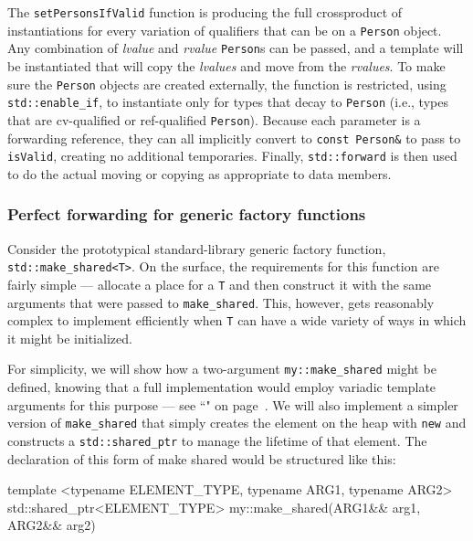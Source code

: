 \noindent The \texttt{setPersonsIfValid} function is producing the full crossproduct of instantiations for every variation of qualifiers that can be
on a \texttt{Person} object. Any combination of \emph{lvalue} and
\emph{rvalue} \texttt{Person}s can be passed, and a template will be
instantiated that will copy the \emph{lvalues} and move from the
\emph{rvalues}. To make sure the \texttt{Person} objects are
created externally, the function is restricted, using
\texttt{std::enable\_if}, to instantiate only for types that decay to
\texttt{Person} (i.e., types that are cv-qualified or ref-qualified
\texttt{Person}). Because each parameter is a forwarding reference, they
can all implicitly convert to \texttt{const}~\texttt{Person\&} to pass
to \texttt{isValid}, creating no additional temporaries. Finally,
\texttt{std::forward} is then used to do the actual moving or copying as
appropriate to data members.

\subsubsection[Perfect forwarding for generic factory functions]{Perfect forwarding for generic factory functions}\label{perfect-forwarding-for-generic-factory-functions}

Consider the prototypical standard-library generic factory function,
\texttt{std::make\_shared<T>}. On the surface, the requirements for this
function are fairly simple --- allocate a place for a \texttt{T} and
then construct it with the same arguments that were passed to
\texttt{make\_shared}. This, however, gets reasonably complex to
implement efficiently when \texttt{T} can have a wide variety of ways in
which it might be initialized.

For simplicity, we will show how a two-argument \texttt{my::make\_shared}
might be defined, knowing that a full implementation would employ
variadic template arguments for this purpose --- see ``" on page~\pageref{variable-templates}. We will also implement a simpler
version of \texttt{make\_shared} that simply creates the element on the
heap with \texttt{new} and constructs a \texttt{std::shared\_ptr} to
manage the lifetime of that element. The declaration of this form of
make shared would be structured like this:

\begin{emcppslisting}
template <typename ELEMENT_TYPE, typename ARG1, typename ARG2>
std::shared_ptr<ELEMENT_TYPE> my::make_shared(ARG1&& arg1, ARG2&& arg2)
\end{emcppslisting}

